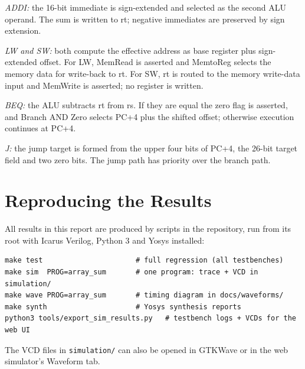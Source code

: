 \documentclass[conference]{IEEEtran}
\begin{document}
\emph{ADDI:} the 16-bit immediate is sign-extended and selected as the second ALU operand. The sum is written to rt; negative immediates are preserved by sign extension.

\emph{LW and SW:} both compute the effective address as base register plus sign-extended offset. For LW, MemRead is asserted and MemtoReg selects the memory data for write-back to rt. For SW, rt is routed to the memory write-data input and MemWrite is asserted; no register is written.

\emph{BEQ:} the ALU subtracts rt from rs. If they are equal the zero flag is asserted, and Branch AND Zero selects PC+4 plus the shifted offset; otherwise execution continues at PC+4.

\emph{J:} the jump target is formed from the upper four bits of PC+4, the 26-bit target field and two zero bits. The jump path has priority over the branch path.

\section{Reproducing the Results}
All results in this report are produced by scripts in the repository, run from its root with Icarus Verilog, Python 3 and Yosys installed:
\begin{lstlisting}
make test                      # full regression (all testbenches)
make sim  PROG=array_sum       # one program: trace + VCD in simulation/
make wave PROG=array_sum       # timing diagram in docs/waveforms/
make synth                     # Yosys synthesis reports
python3 tools/export_sim_results.py   # testbench logs + VCDs for the web UI
\end{lstlisting}
The VCD files in \texttt{simulation/} can also be opened in GTKWave or in the web simulator's Waveform tab.
\end{document}
